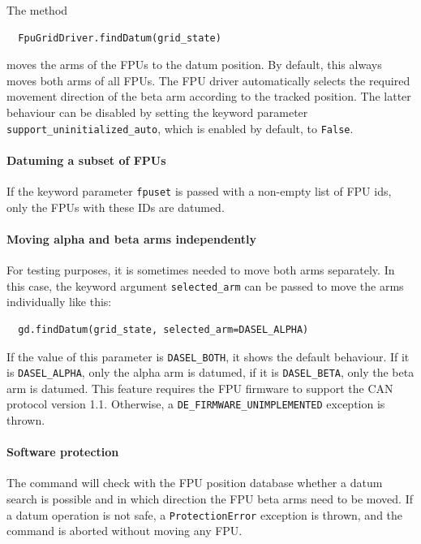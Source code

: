 \documentclass[11pt,a4paper]{scrartcl}
\begin{document}
The method
\begin{verbatim}
  FpuGridDriver.findDatum(grid_state)
\end{verbatim}
moves the arms of the FPUs to the datum position.  By default, this
always moves both arms of all FPUs. The FPU driver automatically
selects the required movement direction of the beta arm according to
the tracked position. The latter behaviour can be disabled by setting
the keyword parameter \texttt{support\_uninitialized\_auto}, which is
enabled by default, to \texttt{False}.

\paragraph{Datuming a subset of FPUs}

If the keyword parameter \texttt{fpuset} is passed with a non-empty
list of FPU ids, only the FPUs with these IDs are datumed.


\paragraph{Moving alpha and beta arms independently}

For testing purposes, it is sometimes needed to move both arms
separately.  In this case, the keyword argument
\texttt{selected\_arm} can be passed to move the arms individually
like this:

\begin{verbatim}
  gd.findDatum(grid_state, selected_arm=DASEL_ALPHA)
\end{verbatim}

\begin{sloppypar}
If the value of this parameter is \texttt{DASEL\_BOTH}, it shows the
default behaviour. If it is \texttt{DASEL\_ALPHA}, only the alpha arm
is datumed, if it is \texttt{DASEL\_BETA}, only the beta arm is
datumed. This feature requires the FPU firmware to support the CAN
protocol version 1.1. Otherwise, a
\texttt{DE\_FIRMWARE\_UNIMPLEMENTED} exception is thrown.
\end{sloppypar}

\paragraph{Software protection}
The command will check with the FPU position database whether a datum
search is possible and in which direction the FPU beta arms need to be
moved. If a datum operation is not safe, a \texttt{ProtectionError}
exception is thrown, and the command is aborted without moving any
FPU.
\end{document}
